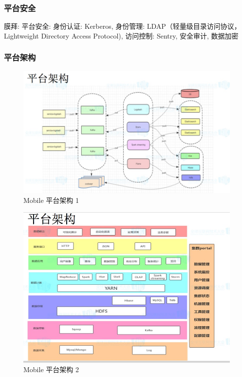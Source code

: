 \documentclass[hyperref, UTF-8]{ctexart}
\begin{document}
\subsubsection{平台安全}
\label{sec:orgc630cc6}
膜拜: 平台安全: 身份认证: Kerberos, 身份管理: LDAP（轻量级目录访问协议，Lightweight Directory Access Protocol), 访问控制: Sentry, 安全审计, 数据加密
\subsubsection{平台架构}
\label{sec:org8e37c69}
\begin{figure}[htbp]
\centering
\includegraphics[width=.9\linewidth]{PPTNote/Jietu20171129-151211_2017-11-29_15-14-54.jpg}
\caption{Mobile 平台架构 1}
\end{figure} 
\begin{figure}[htbp]
\centering
\includegraphics[width=.9\linewidth]{PPTNote/Jietu20171129-151224_2017-11-29_15-15-16.jpg}
\caption{Mobile 平台架构 2}
\end{figure}
\end{document}
